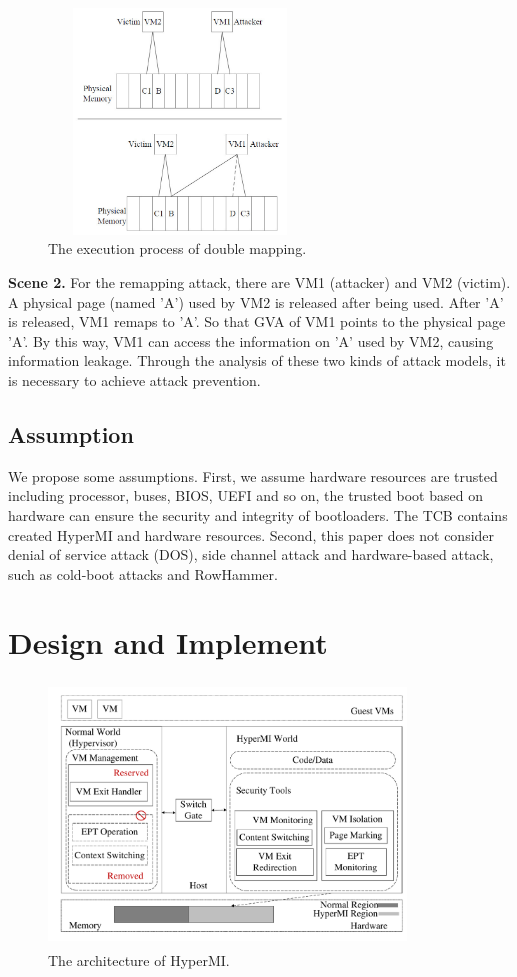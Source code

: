 \documentclass[conference]{IEEEtran}
\begin{document}
\begin{figure}
\centerline{\includegraphics[width=7cm, height=6cm]{VMCS0.jpg}}%
\caption{The execution process of double mapping. } \label{fig0}
\end{figure}

\textbf{Scene 2.}
    For the remapping attack, there are VM1 (attacker) and VM2 (victim). A physical page (named 'A') used by VM2 is released after being used. After 'A' is released, VM1 remaps to 'A'. So that GVA of VM1 points to the physical page 'A'. By this way, VM1 can access the information on 'A' used by VM2, causing information leakage.
Through the analysis of these two kinds of attack models, it is necessary to achieve attack prevention.
\subsection{Assumption}

We propose some assumptions.
First, we assume hardware resources are trusted including processor, buses, BIOS, UEFI and so on, the trusted boot based on hardware can ensure the security and integrity of bootloaders. The TCB contains created HyperMI and hardware resources. Second, this paper does not consider denial of service attack (DOS), side channel attack and hardware-based attack, such as cold-boot attacks and RowHammer.


\section{Design and Implement}\label{sec:design}



\begin{figure}
\centerline{\includegraphics[width=9.5cm, height=7cm]{pdfvmcs1.pdf}}%
\caption{The architecture of HyperMI. } \label{fig1}
\end{figure}
\end{document}
